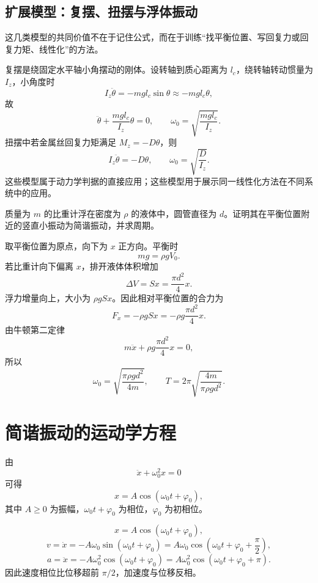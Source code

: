 \subsection*{扩展模型：复摆、扭摆与浮体振动}

这几类模型的共同价值不在于记住公式，而在于训练“找平衡位置、写回复力或回复力矩、线性化”的方法。

\begin{attention}[复摆与扭摆的判据形式]
复摆是绕固定水平轴小角摆动的刚体。设转轴到质心距离为 $l_c$，绕转轴转动惯量为 $I_z$，小角度时
\[
  I_z\ddot\theta=-mgl_c\sin\theta\approx -mgl_c\theta,
\]
故
\[
  \ddot\theta+\frac{mgl_c}{I_z}\theta=0,\qquad
  \omega_0=\sqrt{\frac{mgl_c}{I_z}}.
\]
扭摆中若金属丝回复力矩满足 $M_z=-D\theta$，则
\[
  I_z\ddot\theta=-D\theta,\qquad
  \omega_0=\sqrt{\frac{D}{I_z}}.
\]
这些模型属于动力学判据的直接应用；这些模型用于展示同一线性化方法在不同系统中的应用。
\end{attention}

\begin{example}[title={比重计竖直振动}]\label{eg:hydrometer-shm}
质量为 $m$ 的比重计浮在密度为 $\rho$ 的液体中，圆管直径为 $d$。证明其在平衡位置附近的竖直小振动为简谐振动，并求周期。

\begin{solution}
取平衡位置为原点，向下为 $x$ 正方向。平衡时
\[
  mg=\rho gV_0.
\]
若比重计向下偏离 $x$，排开液体体积增加
\[
  \Delta V=Sx=\frac{\pi d^2}{4}x.
\]
浮力增量向上，大小为 $\rho gSx$。因此相对平衡位置的合力为
\[
  F_x=-\rho gSx=-\rho g\frac{\pi d^2}{4}x.
\]
由牛顿第二定律
\[
  m\ddot x+\rho g\frac{\pi d^2}{4}x=0,
\]
所以
\[
  \omega_0=\sqrt{\frac{\pi\rho gd^2}{4m}},\qquad
  T=2\pi\sqrt{\frac{4m}{\pi\rho gd^2}}.
\]
\end{solution}
\end{example}

\section{简谐振动的运动学方程}

由
\[
  \ddot x+\omega_0^2x=0
\]
可得
\[
  x=A\cos(\omega_0t+\varphi_0),
\]
其中 $A\ge 0$ 为振幅，$\omega_0t+\varphi_0$ 为相位，$\varphi_0$ 为初相位。

\begin{theorem}[位移、速度、加速度]\label{thm:xva-shm}
\[
  x=A\cos(\omega_0t+\varphi_0),
\]
\[
  v=\dot x=-A\omega_0\sin(\omega_0t+\varphi_0)
    =A\omega_0\cos\left(\omega_0t+\varphi_0+\frac{\pi}{2}\right),
\]
\[
  a=\ddot x=-A\omega_0^2\cos(\omega_0t+\varphi_0)
    =A\omega_0^2\cos(\omega_0t+\varphi_0+\pi).
\]
因此速度相位比位移超前 $\pi/2$，加速度与位移反相。
\end{theorem}

